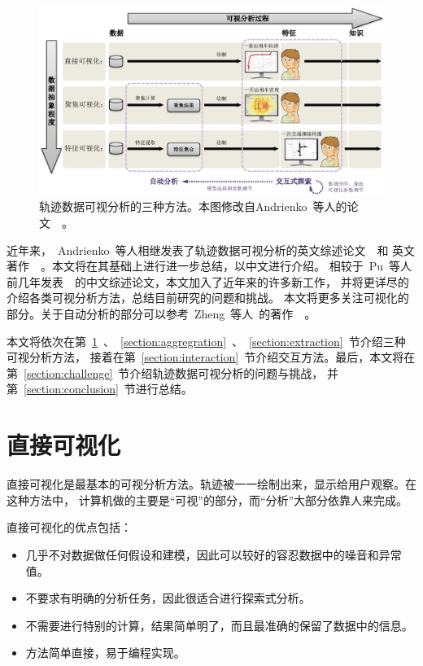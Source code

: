 \documentclass[12pt,twocolumn]{article}
\begin{document}
\begin{figure}[!htb]
\centering
\includegraphics[width=0.85\linewidth]{images/methodoverview.eps}
\caption{\label{fig:overview_method}轨迹数据可视分析的三种方法。本图修改自Andrienko~等人的论文~\citep{AndrienkoADFW2008}~。
}
\end{figure}

近年来，~Andrienko~等人相继发表了轨迹数据可视分析的英文综述论文~\citep{AndrienkoA2013}~和
英文著作~\citep{AndrienkoABKW2013}~。本文将在其基础上进行进一步总结，以中文进行介绍。
相较于~Pu~等人前几年发表~\citep{PuQN2012}~的中文综述论文，本文加入了近年来的许多新工作，
并将更详尽的介绍各类可视分析方法，总结目前研究的问题和挑战。
本文将更多关注可视化的部分。关于自动分析的部分可以参考~Zheng~等人~的著作~\citep{ZhengZ2011}~。

本文将依次在第~\ref{section:direct}~、~\ref{section:aggregration}~、~\ref{section:extraction}~节介绍三种可视分析方法，
接着在第~\ref{section:interaction}~节介绍交互方法。最后，本文将在第~\ref{section:challenge}~节介绍轨迹数据可视分析的问题与挑战，
并第~\ref{section:conclusion}~节进行总结。

\section{直接可视化}
\label{section:direct}

直接可视化是最基本的可视分析方法。轨迹被一一绘制出来，显示给用户观察。在这种方法中，
计算机做的主要是“可视”的部分，而“分析”大部分依靠人来完成。

直接可视化的优点包括：

\begin{itemize}
	\item 几乎不对数据做任何假设和建模，因此可以较好的容忍数据中的噪音和异常值。
	\item 不要求有明确的分析任务，因此很适合进行探索式分析。
	\item 不需要进行特别的计算，结果简单明了，而且最准确的保留了数据中的信息。
	\item 方法简单直接，易于编程实现。
\end{itemize}
\end{document}
